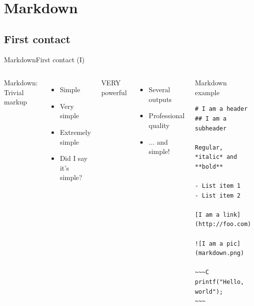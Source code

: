 \documentclass{beamer}
\begin{document}


\section{Markdown}


\subsection{First contact}


\begin{frame}[fragile]{Markdown}{First contact (I)}
	\vspace{-0.3cm}
	\begin{columns}
	Markdown: Trivial markup
	\begin{itemize}
		\item Simple
		\item Very simple
		\item Extremely simple
		\item Did I say it's simple?
	\end{itemize}
	VERY powerful
	\begin{itemize}
		\item Several outputs
		\item Professional quality
		\item ... and simple!
	\end{itemize}
		\begin{exampleblock}{Markdown example}
			\vspace{-0.3cm}
			\begin{lstlisting}[mathescape]
# I am a header
## I am a subheader

Regular, *italic* and **bold**

- List item 1
- List item 2

[I am a link](http://foo.com)

![I am a pic](markdown.png)

~~~C
printf("Hello, world");
~~~
			\end{lstlisting}
			\vspace{-0.2cm}
		\end{exampleblock}
	\end{columns}
\end{frame}
\end{document}
